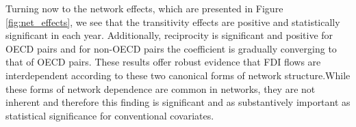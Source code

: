 \documentclass[reqno,onecolumn,letterpaper,12pt]{article}
\begin{document}
Turning now to the network effects, which are presented in Figure \ref{fig:net_effects}, we see that the transitivity effects are positive and statistically significant in each year. Additionally, reciprocity is significant and positive for OECD pairs and for non-OECD pairs the coefficient is gradually converging to that of OECD pairs. These results offer robust evidence that FDI flows are interdependent according to these two canonical forms of network structure.While these forms of network dependence are common in networks, they are not inherent and therefore this finding is significant and as substantively important as statistical significance for conventional covariates.

\end{document}
